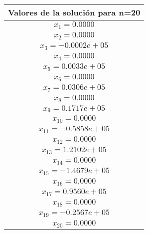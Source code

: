 \documentclass{udpreport}
\begin{document}
\begin{enumerate}
\begin{enumerate}
\begin{table}[H]
\begin{tabular} {|c|}
            \hline
            Valores de la solución para n=20 \\
            \hline
            $x_{1}= 0.0000$\\
            \hline
            $x_{2}=  0.0000$\\
            \hline
            $x_{3}=   -0.0002e+05$\\
            \hline
            $x_{4}=  0.0000$\\
            \hline
            $x_{5}=  0.0033e+05$\\
            \hline
            $x_{6}=  0.0000$\\
            \hline
            $x_{7}=  0.0306e+05$\\
            \hline
            $x_{8}=  0.0000$\\
            \hline
            $x_{9}=  0.1717e+05$\\
            \hline
            $x_{10}= 0.0000$\\
            \hline
            $x_{11}=  -0.5858e+05$\\
            \hline
            $x_{12}= 0.0000$\\
            \hline
            $x_{13}= 1.2102e+05$\\
            \hline
            $x_{14}= 0.0000$\\
            \hline
            $x_{15}= -1.4679e+05$\\
            \hline
            $x_{16}= 0.0000$\\
            \hline
            $x_{17}= 0.9560e+05$\\
            \hline
            $x_{18}= 0.0000$\\
            \hline
            $x_{19}= -0.2567e+05$\\
            \hline
            $x_{20}= 0.0000$\\
            \hline
            \end{tabular}
        \end{table}


\end{enumerate}
\end{enumerate}
\end{document}
